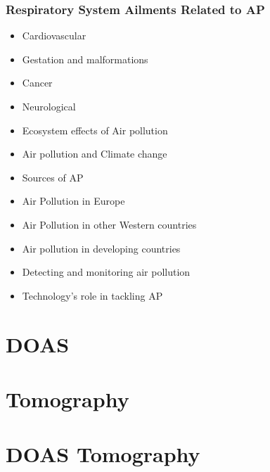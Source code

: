 \subsubsection{Respiratory System Ailments Related to \acrlong{AP}}%
\label{ssub:respiratory_system_ailments_related_to_ap}


\begin{itemize}
    \item Cardiovascular
    \item Gestation and malformations
    \item Cancer
    \item Neurological
\end{itemize}


\begin{itemize}
    \item Ecosystem effects of Air pollution
    \item Air pollution and Climate change
    \item Sources of AP
    \item Air Pollution in Europe
    \item Air Pollution in other Western countries
    \item Air pollution in developing countries
    \item Detecting and monitoring air pollution
    \item Technology's role in tackling AP
\end{itemize}

\section{DOAS}%
\label{sec:doas}

\section{Tomography}%
\label{sec:tomography}

\section{DOAS Tomography}%
\label{sec:doas_tomography}







